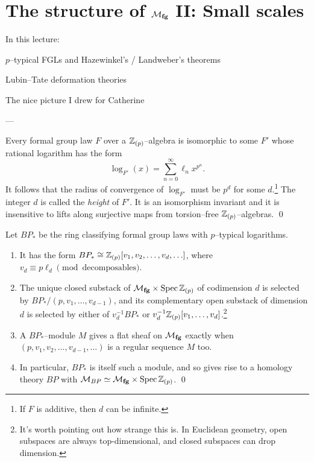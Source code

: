 \section{The structure of $\mathcal{M}_{\mathbf{fg}}$ II: Small scales}

In this lecture:

$p$--typical FGLs and Hazewinkel's / Landweber's theorems

Lubin--Tate deformation theories

The nice picture I drew for Catherine



---

\begin{theorem}[Hazewinkel]
Every formal group law $F$ over a $\mathbb Z_{(p)}$--algebra is isomorphic to some $F'$ whose rational logarithm has the form \[\log_{F'}(x) = \sum_{n=0}^\infty \ell_n x^{p^n}.\]  It follows that the radius of convergence of $\log_{F'}$ must be $p^d$ for some $d$.\footnote{If $F$ is additive, then $d$ can be infinite.}  The integer $d$ is called the \emph{height} of $F'$.  It is an isomorphism invariant and it is insensitive to lifts along surjective maps from torsion--free $\mathbb Z_{(p)}$--algebras. \qed {}
\end{theorem}

\begin{theorem}
Let $BP_*$ be the ring classifying formal group laws with $p$--typical logarithms.
\begin{enumerate}
\item It has the form $BP_* \cong \mathbb Z_{(p)}[v_1, v_2, \ldots, v_d, \ldots]$, where $v_d \equiv p \ell_d \pmod{\text{decomposables}}$.
\item The unique closed substack of $\mathcal{M}_{\mathbf{fg}} \times \operatorname{Spec} \mathbb Z_{(p)}$ of codimension $d$ is selected by $BP_* / (p, v_1, \ldots, v_{d-1})$, and its complementary open substack of dimension $d$ is selected by either of $v_d^{-1} BP_*$ or $v_d^{-1} \mathbb Z_{(p)}[v_1, \ldots, v_d]$.\footnote{It's worth pointing out how strange this is. In Euclidean geometry, open subspaces are always top-dimensional, and closed subspaces can drop dimension.}
\item A $BP_*$--module $M$ gives a flat sheaf on $\mathcal{M}_{\mathbf{fg}}$ exactly when $(p, v_1, v_2, \ldots, v_{d-1}, \ldots)$ is a regular sequence $M$ too.
\item In particular, $BP_*$ is itself such a module, and so gives rise to a homology theory $BP$ with $\mathcal{M}_{BP} \simeq \mathcal{M}_{\mathbf{fg}} \times \operatorname{Spec} \mathbb Z_{(p)}$. \qed
\end{enumerate}
\end{theorem}


